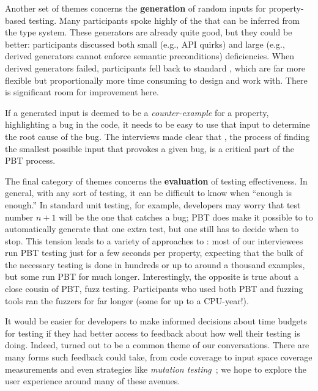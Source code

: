 Another set of themes concerns the {\bf generation} of
random inputs for property-based testing. Many participants spoke
highly of the  that can be inferred from the type system.
These generators are already quite good, but they could be better: participants
discussed both small (e.g., API quirks) and large (e.g., derived generators
cannot enforce semantic preconditions) deficiencies. When derived generators
failed, participants fell back to standard , which
are far more flexible but proportionally more time consuming to design
and work with. There is significant room for improvement here.

If a generated input is deemed to be a {\em counter-example} for a
property, highlighting a bug in the code, it needs to be easy to use that
input to determine the root cause of the bug. The interviews made clear that
, the process of finding the smallest possible input that
provokes a given bug, is a critical part of the PBT process.

The final category of themes concerns the {\bf evaluation} of testing
effectiveness. In
general, with any sort of
testing, it can be difficult to know when ``enough is enough.'' In
standard unit testing, for example, developers may worry that test number
$n + 1$ will be the one that catches a bug; PBT does make it possible to to
automatically generate that one extra test, but one still has to decide when to
stop. This tension leads to a variety of approaches to
: most of our interviewees run PBT
testing just for a few seconds per property, expecting
that the bulk of the necessary testing is done in hundreds or up to around a
thousand examples, but some run PBT for much longer. Interestingly, the opposite
is true about a close cousin of PBT, fuzz testing. Participants who used both
PBT and fuzzing tools ran the fuzzers for far longer (some for up to a CPU-year!).

It would be easier for developers to make informed decisions about
time budgets for testing if
they had better access to feedback about how well their testing is doing.
Indeed,  turned out to be a common theme of our
conversations. There are many forms such feedback could take, from
code coverage to input space coverage measurements and even strategies like {\em mutation
testing}~\cite{papadakis_mutation_2018}; we hope to explore the user experience
around many of these avenues.

